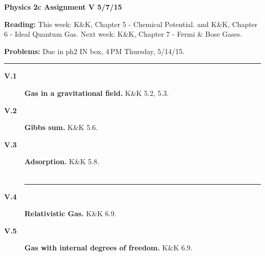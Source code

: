 \documentclass[11pt]{article}
\def\hb{\hfill\break}
\begin{document}
%
\centerline{\large\bf Physics 2c \hfill Assignment V \hfill  5/7/15}

\medskip
\begin{list}{}{\leftmargin 2.4cm  .2cm }
\item[{\bf Reading:}  \hfill ] This week: K\&K, Chapter 5 - Chemical Potential. \hb
                               and        K\&K, Chapter 6 - Ideal Quantum Gas. \hb
                               Next week: K\&K, Chapter 7 - Fermi \& Bose Gases.
\item[{\bf Problems:} \hfill ] Due in ph2 IN box, 4\,PM  Thursday, 5/14/15.
\end{list}

\hrule

\begin{description}

\item[{\bf V.1} ] {\bf Gas in a gravitational field.} K\&K 5.2, 5.3.

\item[{\bf V.2} ] {\bf Gibbs sum.} K\&K 5.6.

\item[{\bf V.3} ] {\bf Adsorption.} K\&K 5.8.\\
\\
\hrule

\item[{\bf V.4}] {\bf Relativistic Gas.} K\&K 6.9.

\item[{\bf V.5}] {\bf Gas with internal degrees of freedom.} K\&K 6.9.


\end{description}
\end{document}
